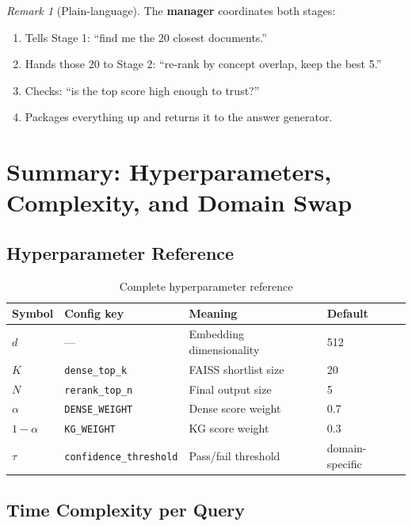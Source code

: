\documentclass[12pt,a4paper]{article}
\theoremstyle{definition}
\theoremstyle{remark}
\newtheorem{remark}[theorem]{Remark}
\begin{document}
\begin{remark}[Plain-language]
The \textbf{manager} coordinates both stages:
\begin{enumerate}
  \item Tells Stage 1: ``find me the 20 closest documents.''
  \item Hands those 20 to Stage 2: ``re-rank by concept overlap, keep the best 5.''
  \item Checks: ``is the top score high enough to trust?''
  \item Packages everything up and returns it to the answer generator.
\end{enumerate}
\end{remark}

\section{Summary: Hyperparameters, Complexity, and Domain Swap}

\subsection{Hyperparameter Reference}

\begin{table}[H]
\centering
\caption{Complete hyperparameter reference}
\begin{tabularx}{\textwidth}{llXl}
\toprule
Symbol & Config key & Meaning & Default \\
\midrule
$d$ & --- & Embedding dimensionality & 512 \\
$K$ & \texttt{dense\_top\_k} & FAISS shortlist size & 20 \\
$N$ & \texttt{rerank\_top\_n} & Final output size & 5 \\
$\alpha$ & \texttt{DENSE\_WEIGHT} & Dense score weight & 0.7 \\
$1{-}\alpha$ & \texttt{KG\_WEIGHT} & KG score weight & 0.3 \\
$\tau$ & \texttt{confidence\_threshold} & Pass/fail threshold & domain-specific \\
\bottomrule
\end{tabularx}
\end{table}

\subsection{Time Complexity per Query}
\end{document}
